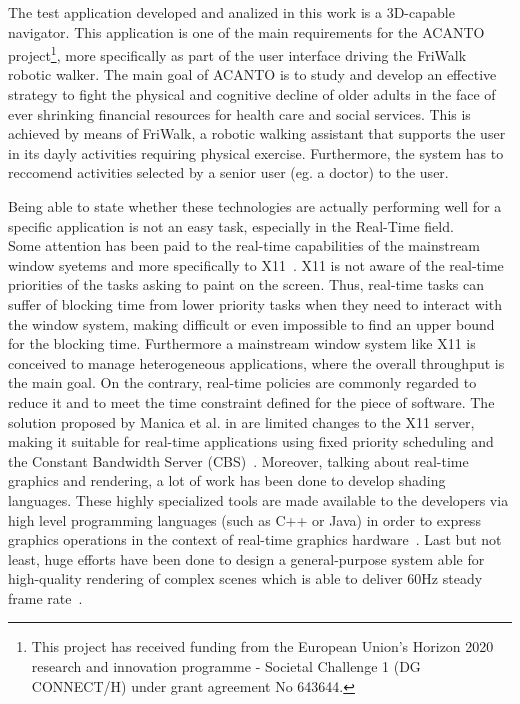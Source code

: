The test application developed and analized in this work is a 3D-capable navigator.
This application is one of the main requirements for the ACANTO~\cite{acanto}
project\footnote{This project has received funding from the European Union’s Horizon
2020 research and innovation programme - Societal Challenge 1 (DG CONNECT/H) under 
grant agreement No 643644.}, more specifically as part of the user interface driving
the FriWalk robotic walker.
The main goal of ACANTO is to study and develop an effective strategy to fight the
physical and cognitive decline of older adults in the face of ever shrinking financial
resources for health care and social services. This is achieved by means of FriWalk,
a robotic walking assistant that supports the user in its dayly activities requiring
physical exercise. Furthermore, the system has to reccomend activities selected 
by a senior user (eg. a doctor) to the user.

Being able to state whether these technologies are actually performing well for
a specific application is not an easy task, especially in the Real-Time field.\\
Some attention has been paid to the real-time capabilities of the mainstream window
syetems and more specifically to X11~\cite{manica2008qos}. X11 is not aware of the
real-time priorities of the tasks asking to paint on the screen. Thus, real-time
tasks can suffer of blocking time from lower priority tasks when they need to
interact with the window system, making difficult or even impossible to find an
upper bound for the blocking time. Furthermore a mainstream window system like X11
is conceived to manage heterogeneous applications, where the overall throughput
is the main goal. On the contrary, real-time policies are commonly regarded to
reduce it and to meet the time constraint defined for the piece of software.
The solution proposed by Manica et al. in \cite{manica2008qos} are limited
changes to the X11 server, making it suitable for real-time applications using
fixed priority scheduling and the Constant Bandwidth Server
(CBS)~\cite{buttazzo2006optimal}. Moreover, talking about real-time graphics and rendering, a lot of work has been
done to develop shading languages. These highly specialized tools
are made available to the developers via high level programming languages
(such as C++ or Java) in order to express graphics operations in the context
of real-time graphics hardware~\cite{Fernando:2003:CTD:862247}. Last but not least,
huge efforts have been done to design a general-purpose system able for high-quality
rendering of complex scenes which is able to deliver 60Hz steady frame
rate~\cite{Montrym:1997:IRG:258734.258871}.

